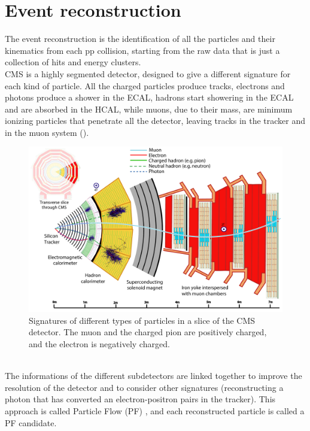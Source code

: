 
\label{sec:RECO}
\minitoc

\section{Event reconstruction}
The event reconstruction is the identification of all the particles and their kinematics from each pp collision, starting from the raw data that is just a collection of hits and energy clusters.\\
CMS is a highly segmented detector, designed to give a different signature for each kind of particle.
All the charged particles produce tracks, electrons and photons produce a shower in the ECAL, hadrons start showering in the ECAL and are absorbed in the HCAL, while muons, due to their mass, are minimum ionizing particles that penetrate all the detector, leaving tracks in the tracker and in the muon system ().
\begin{figure}[h!]
    \centering
    \includegraphics[width=\linewidth]{fig//chap04-reco/CMS_detector_PID_edit.pdf}
    \caption{Signatures of different types of particles in a slice of the CMS detector. The muon and the charged pion are positively charged, and the electron is negatively charged. \cite{Sirunyan2017Particle-flowDetector}}
    \label{fig:PF}
\end{figure}
\\
The informations of the different subdetectors are linked together to improve the resolution of the detector and to consider other signatures (\eg reconstructing a photon that has converted an electron-positron pairs in the tracker).
This approach is called Particle Flow (PF) \cite{Sirunyan2017Particle-flowDetector}, and each reconstructed particle is called a PF candidate.



